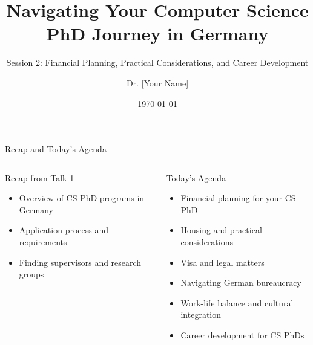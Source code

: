 \documentclass[aspectratio=169,10pt]{beamer}
\title{Navigating Your Computer Science PhD Journey in Germany}
\subtitle{Session 2: Financial Planning, Practical Considerations, and Career Development}
\date{\today}
\author{Dr. [Your Name]}
\institute{[Your Institution]}
\begin{document}
\maketitle

\begin{frame}{Recap and Today's Agenda}
\begin{columns}[T]
    \begin{column}{0.5\textwidth}
        \alert{Recap from Talk 1}
        \begin{itemize}
            \item Overview of CS PhD programs in Germany
            \item Application process and requirements
            \item Finding supervisors and research groups
        \end{itemize}
    \end{column}
    \begin{column}{0.5\textwidth}
        \alert{Today's Agenda}
        \begin{itemize}
            \item Financial planning for your CS PhD
            \item Housing and practical considerations
            \item Visa and legal matters
            \item Navigating German bureaucracy
            \item Work-life balance and cultural integration
            \item Career development for CS PhDs
        \end{itemize}
    \end{column}
\end{columns}
\end{frame}
\end{document}
